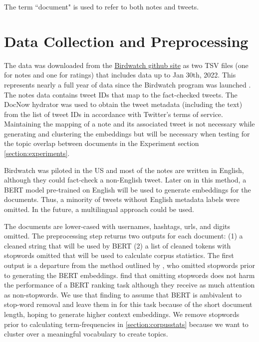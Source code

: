 \documentclass [11pt, proquest] {uwthesis}[2020/02/24]
\begin{document}
The term ``document" is used to refer to both notes and tweets.


\section{Data Collection and Preprocessing}\label{section:preprocessing}

The data was downloaded from the \href{https://twitter.github.io/birdwatch/download-data/}{Birdwatch github site} as two TSV files (one for notes and one for ratings) that includes data up to Jan 30th, 2022. This represents nearly a full year of data since the Birdwatch program was launched \cite{coleman_2021}. The notes data contains tweet IDs that map to the fact-checked tweets. The DocNow hydrator \citep{docnow_hydrator} was used to obtain the tweet metadata (including the text) from the list of tweet IDs in accordance with Twitter’s terms of service. Maintaining the mapping of a note and its associated tweet is not necessary while generating and clustering the embeddings but will be necessary when testing for the topic overlap between documents in the Experiment section \ref{section:experiments}.

Birdwatch was piloted in the US and most of the notes are written in English, although they could fact-check a non-English tweet. Later on in this method, a BERT model pre-trained on English \citep{DBLP:journals/corr/abs-1810-04805} will be used to generate embeddings for the documents. Thus, a minority of tweets without English metadata labels were omitted. In the future, a multilingual approach could be used.

The documents are lower-cased with usernames, hashtags, urls, and digits omitted. The preprocessing step returns two outputs for each document: (1) a cleaned string that will be used by BERT (2) a list of cleaned tokens with stopwords omitted that will be used to calculate corpus statistics. The first output  is a departure from the method outlined by \cite{sia-etal-2020-tired}, who omitted stopwords prior to generating the BERT embeddings. \cite{Qiao2019UnderstandingTB} find that omitting stopwords does not harm the performance of a BERT ranking task although they receive as much attention as non-stopwords. We use that finding to assume that BERT is ambivalent to stop-word removal and leave them in for this task because of the short document length, hoping to generate higher context embeddings. We remove stopwords prior to calculating term-frequencies in \ref{section:corpusstats} because we want to cluster over a meaningful vocabulary to create topics.
\end{document}
